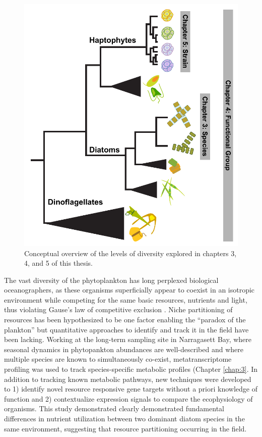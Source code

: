 \begin{figure}[p!]
  \centering
    \includegraphics[width=.7\textwidth]{Images/C1_ThesisDiagram.pdf}
    \caption{Conceptual overview of the levels of diversity explored in chapters 3, 4, and 5 of this thesis.}
  \label{fig:c1f1}
\end{figure}


The vast diversity of the phytoplankton has long perplexed biological oceanographers, as these organisms superficially appear to coexist in an isotropic environment while competing for the same basic resources, nutrients and light, thus violating Gause's law of competitive exclusion \citep{Hardin1960}. Niche partitioning of resources has been hypothesized to be one factor enabling the ``paradox of the plankton'' \citep{Hutchinson1961} but quantitative approaches to identify and track it in the field have been lacking. Working at the long-term sampling site in Narragasett Bay, where seasonal dynamics in phytopankton abundances are well-described and where multiple species are known to simultaneously co-exist, metatranscriptome profiling was used to track species-specific metabolic profiles (Chapter \ref{chap:3}. In addition to tracking known metabolic pathways, new techniques were developed to 1) identify novel resource responsive gene targets without a priori knowledge of function and 2) contextualize expression signals to compare the ecophysiology of organisms. This study demonstrated clearly demonstrated fundamental differences in nutrient utilization between two dominant diatom species in the same environment, suggesting that resource partitioning occurring in the field.\par 

